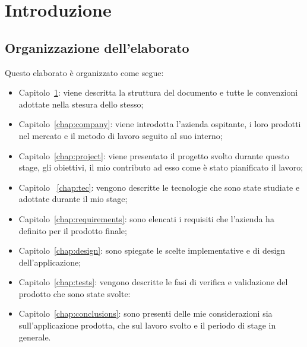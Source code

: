 \mainmatter

\chapter{Introduzione}\label{chap:intro}

\section{Organizzazione dell'elaborato}
Questo elaborato è organizzato come segue: 
\begin{itemize}
	\item Capitolo~\ref{chap:intro}: viene descritta la struttura del documento e tutte le convenzioni adottate nella stesura dello stesso;
	\item Capitolo~\ref{chap:company}: viene introdotta l'azienda ospitante, i loro prodotti nel mercato e il metodo di lavoro seguito al suo interno;
	\item Capitolo~\ref{chap:project}: viene presentato il progetto svolto durante questo stage, gli obiettivi, il mio contributo ad esso come è stato pianificato il lavoro;
	\item Capitolo ~\ref{chap:tec}: vengono descritte le tecnologie che sono state studiate e adottate durante il mio stage;
	\item Capitolo~\ref{chap:requirements}: sono elencati i requisiti che l'azienda ha definito per il prodotto finale;
	\item Capitolo~\ref{chap:design}: sono spiegate le scelte implementative e di design dell'applicazione;
	\item Capitolo~\ref{chap:tests}: vengono descritte le fasi di verifica e validazione del prodotto che sono state svolte:
	\item Capitolo~\ref{chap:conclusions}: sono presenti delle mie considerazioni sia sull'applicazione prodotta, che sul lavoro svolto e il periodo di stage in generale.
\end{itemize}

